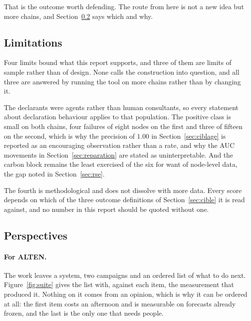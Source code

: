 That is the outcome worth defending. The route from here is not a new idea but more chains,
and Section~\ref{sec:perspectives} says which and why.

\subsection{Limitations}
\label{sec:conclusion_limites}

Four limits bound what this report supports, and three of them are limits of sample rather
than of design. None calls the construction into question, and all three are answered by
running the tool on more chains rather than by changing it.

The declarants were agents rather than human consultants, so every statement about declaration
behaviour applies to that population. The positive class is small on both chains, four failures
of eight nodes on the first and three of fifteen on the second, which is why the precision of
$1.00$ in Section~\ref{sec:ciblage} is reported as an encouraging observation rather than a
rate, and why the AUC movements in Section~\ref{sec:reparation} are stated as uninterpretable.
And the carbon block remains the least exercised of the six for want of node-level data, the
gap noted in Section~\ref{sec:rse}.

The fourth is methodological and does not dissolve with more data. Every score depends on
which of the three outcome definitions of Section~\ref{sec:cible} it is read against, and no
number in this report should be quoted without one.

\subsection{Perspectives}
\label{sec:perspectives}

\paragraph{For ALTEN.}
The work leaves a system, two campaigns and an ordered list of what to do next.
Figure~\ref{fig:suite} gives the list with, against each item, the measurement that produced
it. Nothing on it comes from an opinion, which is why it can be ordered at all: the first item
costs an afternoon and is measurable on forecasts already frozen, and the last is the only one
that needs people.

